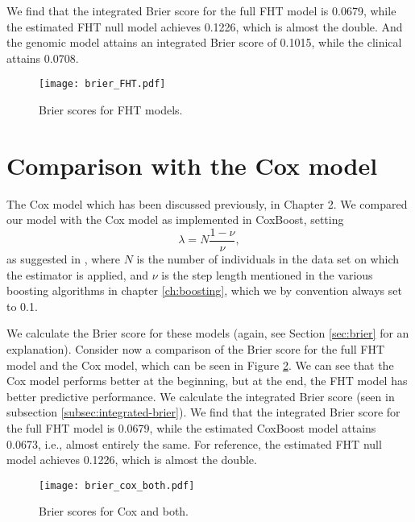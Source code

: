 We find that the integrated Brier score for the full FHT model is 0.0679, while the estimated FHT null model achieves 0.1226, which is almost the double.
And the genomic model attains an integrated Brier score of 0.1015, while the clinical attains 0.0708.

\begin{figure}
\caption{Brier scores for FHT models.}
\label{fig:brier-FHT}
\centering\texttt{[image: brier\_FHT.pdf]}
\end{figure}

\section{Comparison with the Cox model}
The Cox model which has been discussed previously, in Chapter 2.
We compared our model with the Cox model as implemented in CoxBoost, setting
\begin{equation}\label{eq:lambda-nu}
    \lambda=N\frac{1-\nu}{\nu},
\end{equation}
as suggested in \citet{DeBin2016}, where $N$ is the number of individuals in the data set on which the estimator is applied, and $\nu$ is the step length mentioned in the various boosting algorithms in chapter \ref{ch:boosting}, which we by convention always set to 0.1.

We calculate the Brier score for these models (again, see Section \ref{sec:brier} for an explanation).
Consider now a comparison of the Brier score for the full FHT model and the Cox model, which can be seen in Figure \ref{fig:brier-cox-both}.
We can see that the Cox model performs better at the beginning, but at the end, the FHT model has better predictive performance.
We calculate the integrated Brier score (seen in subsection \ref{subsec:integrated-brier}).
We find that the integrated Brier score for the full FHT model is 0.0679, while the estimated CoxBoost model attains 0.0673, i.e., almost entirely the same.
For reference, the estimated FHT null model achieves 0.1226, which is almost the double.

\begin{figure}
\caption{Brier scores for Cox and both.}
\label{fig:brier-cox-both}
\centering\texttt{[image: brier\_cox\_both.pdf]}
\end{figure}


